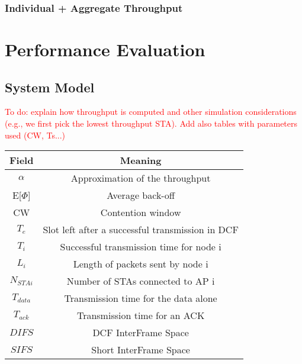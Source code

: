 \documentclass{ article}
\begin{document}
		\subsubsection{Individual + Aggregate Throughput}
		\label{section:mix}

\section{Performance Evaluation}
\label{section:performance_evaluation}

	\subsection{System Model}
	\label{section:system_model}
		\textcolor{red}{To do: explain how throughput is computed and other simulation considerations (e.g., we first pick the lowest throughput STA). Add also tables with parameters used (CW, Ts...)}	
	\begin{center}\renewcommand*{\arraystretch}{1.25}
\setlength\tabcolsep{15pt}

\begin{tabular}{|c|c|}


  \hline
  
   \textbf{Field} & \textbf{Meaning}\\ \hline
 $\alpha$  & Approximation of the throughput \\\hline
  E[$\Phi$] & Average back-off\\\hline
  CW & Contention window \\\hline
  $T_e$ & Slot left after a successful transmission in DCF \\\hline
  $T_i$ & Successful transmission time for node i\\\hline
  $L_i$ & Length of packets sent by node i\\\hline
  $N_{STAi}$ & Number of STAs connected to AP i\\\hline
  $T_{data}$ & Transmission time for the data alone\\\hline
  $T_{ack}$ & Transmission time for an ACK\\\hline
  $DIFS$ & DCF InterFrame Space \\\hline
  $SIFS$ & Short InterFrame Space \\\hline


\end{tabular}

\end{center}
\end{document}
